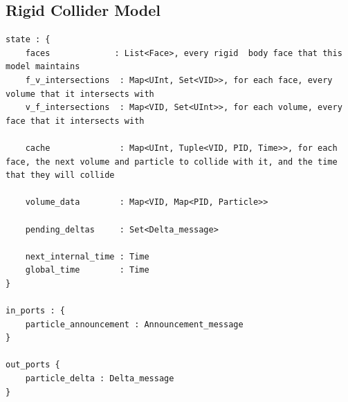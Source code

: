 \documentclass[conference]{IEEEtran}
\begin{document}
\subsection{Rigid Collider Model}
\begin{lstlisting}
state : {
	faces             : List<Face>, every rigid  body face that this model maintains
	f_v_intersections  : Map<UInt, Set<VID>>, for each face, every volume that it intersects with
	v_f_intersections  : Map<VID, Set<UInt>>, for each volume, every face that it intersects with
	
	cache              : Map<UInt, Tuple<VID, PID, Time>>, for each face, the next volume and particle to collide with it, and the time that they will collide
	
	volume_data        : Map<VID, Map<PID, Particle>>
	
	pending_deltas     : Set<Delta_message>
	
	next_internal_time : Time
	global_time        : Time
}

in_ports : {
	particle_announcement : Announcement_message
}

out_ports {
	particle_delta : Delta_message
}
\end{lstlisting}
\end{document}

